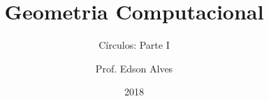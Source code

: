 \title{Geometria Computacional}
\subtitle{Círculos: Parte I}
\date{2018}
\author{Prof. Edson Alves}
